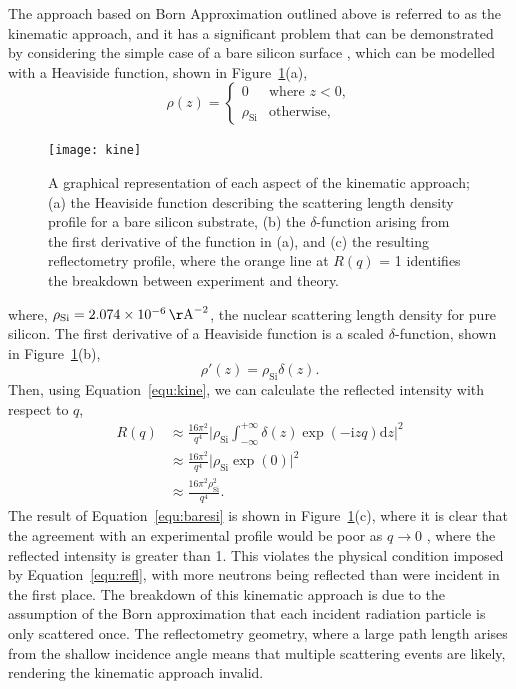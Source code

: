 \documentclass[
 reprint,
 superscriptaddress,
 amsmath,amssymb,
 aps,
]{revtex4-1}
\newcommand{\angstrom}{\rm{\AA}}
\begin{document}
The approach based on Born Approximation outlined above  is referred to as the kinematic approach, and it has a significant problem that can be demonstrated by considering the simple case of a bare silicon surface \cite{sivia_elementary_2011}, which can be modelled with a Heaviside function, shown in Figure~\ref{fig:kine}(a),
%
\begin{equation}
    \rho(z) =
    \begin{cases}
        0 & \text{where } z < 0,\\
        \rho_{\text{Si}} & \text{otherwise},
    \end{cases}
\end{equation}
%
%
\begin{figure}[t]
    \texttt{[image: kine]}
    \caption{A graphical representation of each aspect of the kinematic approach; (a) the Heaviside function describing the scattering length density profile for a bare silicon substrate, (b) the $\delta$-function arising from the first derivative of the function in (a), and (c) the resulting reflectometry profile, where the orange line at $R(q)$ = 1 identifies the breakdown between experiment and theory.}
    \label{fig:kine}
\end{figure}
%
where, $\rho_{\text{Si}} = \SI{2.074e-6}{\angstrom^{-2}}$, the nuclear scattering length density for pure silicon.
The first derivative of a Heaviside function is a scaled $\delta$-function, shown in Figure~\ref{fig:kine}(b),
%
\begin{equation}
    \rho'(z) = \rho_{\text{Si}}\delta(z).
\end{equation}
%
Then, using Equation~\ref{equ:kine}, we can calculate the reflected intensity with respect to $q$,
%
\begin{equation}
    \begin{aligned}
    R(q) & \approx \frac{16\pi^2}{q^4} \bigg| \rho_{\text{Si}}\int^{+\infty}_{-\infty}{\delta(z)\exp{(-\mathrm{i} zq) \text{d}z}} \bigg|^2 \\
     & \approx \frac{16\pi^2}{q^4} \bigg| \rho_{\text{Si}} \exp{(0)} \bigg| ^2 \\
     & \approx \frac{16\pi^2\rho_{\text{Si}}^2}{q^4}.
    \end{aligned}
    \label{equ:baresi}
\end{equation}
%
The result of Equation~\ref{equ:baresi} is shown in Figure~\ref{fig:kine}(c), where it is clear that the agreement with an experimental profile would be poor as $q \to 0$ \cite{majkrzak_exact_1998}, where the reflected intensity is greater than \num{1}.
This violates the physical condition imposed by Equation~\ref{equ:refl}, with more neutrons being reflected than were incident in the first place.
The breakdown of this kinematic approach is due to the assumption of the Born approximation that each incident radiation particle is only scattered once.
The reflectometry geometry, where a large path length arises from the shallow incidence angle means that multiple scattering events are likely, rendering the kinematic approach invalid.
\end{document}
